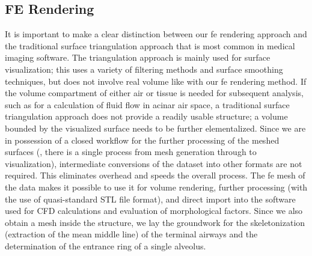 \subsection{FE \threed Rendering}
It is important to make a clear distinction between our \ac{fe} \threed rendering approach and the traditional surface triangulation approach that is most common in medical imaging software. The triangulation approach is mainly used for surface visualization; this uses a variety of filtering methods and surface smoothing techniques, but does not involve real volume like with our \ac{fe} \threed rendering method. If the volume compartment of either air or tissue is needed for subsequent analysis, such as for a calculation of fluid flow in acinar air space, a traditional surface triangulation approach does not provide a readily usable \threed structure; a volume bounded by the visualized surface needs to be further elementalized. Since we are in possession of a closed workflow for the further processing of the meshed surfaces (\ie, there is a single process from mesh generation through to visualization), intermediate conversions of the dataset into other formats are not required. This eliminates overhead and speeds the overall process. The \ac{fe} mesh of the data makes it possible to use it for volume rendering, further processing (with the use of quasi-standard \acs{STL} file format), and direct import into the software used for \ac{CFD} calculations and evaluation of morphological factors. Since we also obtain a mesh inside the structure, we lay the groundwork for the skeletonization (extraction of the mean middle line) of the terminal airways and the determination of the entrance ring of a single alveolus.

